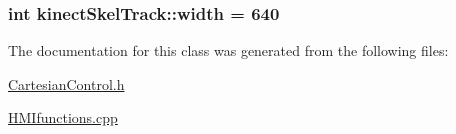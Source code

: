 \subsubsection[{\texorpdfstring{width}{width}}]{\setlength{\rightskip}{0pt plus 5cm}int kinect\+Skel\+Track\+::width = 640}\hypertarget{classkinectSkelTrack_a8f20f39c8822eecba07518a8b35a9f2b}{}\label{classkinectSkelTrack_a8f20f39c8822eecba07518a8b35a9f2b}


The documentation for this class was generated from the following files\+:\begin{DoxyCompactItemize}
\item 
\hyperlink{CartesianControl_8h}{Cartesian\+Control.\+h}\item 
\hyperlink{HMIfunctions_8cpp}{H\+M\+Ifunctions.\+cpp}\end{DoxyCompactItemize}
